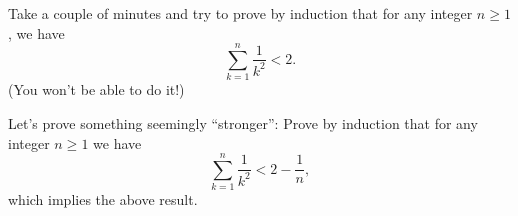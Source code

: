 Take a couple of minutes and try to prove by induction that for any integer $n \geq 1$, we have
\[\sum_{k = 1}^n\frac{1}{k^2} < 2.\]
(You won't be able to do it!)

Let's prove something seemingly ``stronger'': Prove by induction that for any integer $n \geq 1$ we have
\[\sum_{k = 1}^n\frac{1}{k^2} < 2 - \frac{1}{n},\] which implies the above result.